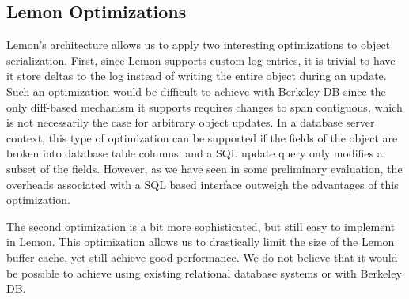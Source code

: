 \documentclass[10pt,letterpaper,twocolumn,english]{article}
\newcommand{\yad}{Lemon\xspace}
\begin{document}
\subsection{\yad Optimizations}

\label{version-pages}

\yad's architecture allows us to apply two interesting optimizations
to object serialization.  First, since \yad supports
custom log entries, it is trivial to have it store deltas to
the log instead of writing the entire object during an update.
Such an optimization would be difficult to achieve with Berkeley DB 
since the only diff-based mechanism it supports requires changes to 
span contiguous, which is not necessarily the case for arbitrary
object updates.
In a database server context, this type of optimization can be
supported if the fields of the object are broken into database table
columns. and a SQL update query only modifies a subset of the fields. 
However, as we have seen in some preliminary evaluation, 
the overheads associated with a SQL based interface outweigh the
advantages of this optimization.




The second optimization is a bit more sophisticated, but still easy to
implement in \yad.  This optimization allows us to drastically limit
the size of the
\yad buffer cache, yet still achieve good performance.
We do not believe that it would be possible to
achieve using existing relational database systems or with Berkeley DB.  
\end{document}
